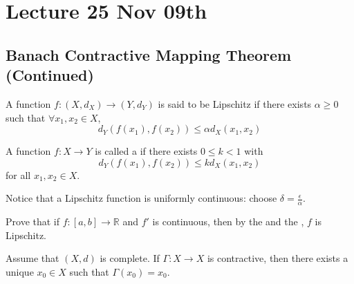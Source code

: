 \documentclass[notoc,notitlepage]{tufte-book}
\begin{document}
\chapter{Lecture 25 Nov 09th}%
\label{chp:lecture_25_nov_09th}

\section{Banach Contractive Mapping Theorem (Continued)}%
\label{sec:banach_contractive_mapping_theorem_continued}

\begin{defn}[Lipschitz]\label{defn:lipschitz}
  A function $f : (X, d_X) \to (Y, d_Y)$ is said to be Lipschitz if there exists $\alpha \geq 0$ such that $\forall x_1, x_2 \in X$,
  \begin{equation*}
    d_Y( f(x_1), f(x_2) ) \leq \alpha d_X(x_1, x_2)
  \end{equation*}
\end{defn}

\begin{defn}[Contraction]\label{defn:contraction}
  A function $f : X \to Y$ is called a  if there exists $0 \leq k < 1$ with
  \begin{equation*}
    d_Y( f(x_1), f(x_2) ) \leq k d_X(x_1, x_2)
  \end{equation*}
  for all $x_1, x_2 \in X$.
\end{defn}

\begin{note}
  Notice that a Lipschitz function is uniformly continuous: choose $\delta = \frac{\epsilon}{\alpha}$.
\end{note}

\begin{ex}
  Prove that if $f : [a, b] \to \mathbb{R}$ and $f'$ is continuous, then by the  and the , $f$ is Lipschitz.
\end{ex}

\begin{thm}\label{thm:banach_contractive_mapping_theorem}
  Assume that $(X, d)$ is complete. If $\Gamma : X \to X$ is contractive, then there exists a unique $x_0 \in X$ such that $\Gamma (x_0) = x_0$.
\end{thm}
\end{document}
